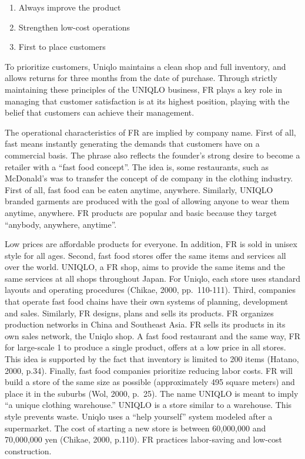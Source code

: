 \documentclass[12pt,]{article}
\providecommand{\tightlist}{%
  \setlength{\itemsep}{0pt}\setlength{\parskip}{0pt}}
\begin{document}
\begin{enumerate}
\def\labelenumi{(\arabic{enumi})}
\tightlist
\item
  Always improve the product
\item
  Strengthen low-cost operations
\item
  First to place customers
\end{enumerate}

To prioritize customers, Uniqlo maintains a clean shop and full
inventory, and allows returns for three months from the date of
purchase. Through strictly maintaining these principles of the UNIQLO
business, FR plays a key role in managing that customer satisfaction is
at its highest position, playing with the belief that customers can
achieve their management.

The operational characteristics of FR are implied by company name. First
of all, fast means instantly generating the demands that customers have
on a commercial basis. The phrase also reflects the founder's strong
desire to become a retailer with a ``fast food concept''. The idea is,
some restaurants, such as McDonald's was to transfer the concept of de
company in the clothing industry. First of all, fast food can be eaten
anytime, anywhere. Similarly, UNIQLO branded garments are produced with
the goal of allowing anyone to wear them anytime, anywhere. FR products
are popular and basic because they target ``anybody, anywhere,
anytime''.

Low prices are affordable products for everyone. In addition, FR is sold
in unisex style for all ages. Second, fast food stores offer the same
items and services all over the world. UNIQLO, a FR shop, aims to
provide the same items and the same services at all shops throughout
Japan. For Uniqlo, each store uses standard layouts and operating
procedures (Chikae, 2000, pp.~110-111). Third, companies that operate
fast food chains have their own systems of planning, development and
sales. Similarly, FR designs, plans and sells its products. FR organizes
production networks in China and Southeast Asia. FR sells its products
in its own sales network, the Uniqlo shop. A fast food restaurant and
the same way, FR for large-scale 1 to produce a single product, offers
at a low price in all stores. This idea is supported by the fact that
inventory is limited to 200 items (Hatano, 2000, p.34). Finally, fast
food companies prioritize reducing labor costs. FR will build a store of
the same size as possible (approximately 495 square meters) and place it
in the suburbs (Wol, 2000, p.~25). The name UNIQLO is meant to imply ``a
unique clothing warehouse.'' UNIQLO is a store similar to a warehouse.
This style prevents waste. Uniqlo uses a ``help yourself'' system
modeled after a supermarket. The cost of starting a new store is between
60,000,000 and 70,000,000 yen (Chikae, 2000, p.110). FR practices
labor-saving and low-cost construction.
\end{document}
